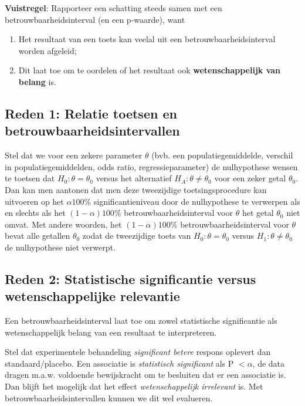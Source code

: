 \documentclass[
  12pt,dutch,coursenotes]{book}
\providecommand{\tightlist}{%
  \setlength{\itemsep}{0pt}\setlength{\parskip}{0pt}}
\theoremstyle{definition}
\theoremstyle{definition}
\theoremstyle{definition}
\theoremstyle{remark}
\begin{document}
\textbf{Vuistregel}:
Rapporteer een schatting steeds samen met een betrouwbaarheidsinterval (en een p-waarde), want

\begin{enumerate}
\def\labelenumi{\arabic{enumi}.}
\tightlist
\item
  Het resultaat van een toets kan veelal uit een betrouwbaarheidsinterval worden afgeleid;
\item
  Dit laat toe om te oordelen of het resultaat ook \textbf{wetenschappelijk van belang} is.
\end{enumerate}

\hypertarget{reden-1-relatie-toetsen-en-betrouwbaarheidsintervallen}{%
\subsection{Reden 1: Relatie toetsen en betrouwbaarheidsintervallen}\label{reden-1-relatie-toetsen-en-betrouwbaarheidsintervallen}}

Stel dat we voor een zekere parameter \(\theta\) (bvb. een
populatiegemiddelde, verschil in populatiegemiddelden, odds ratio,
regressieparameter) de nulhypothese wensen te toetsen dat \(H_0 : \theta= \theta_0\) versus het alternatief \(H_A : \theta \neq \theta_0\) voor een zeker
getal \(\theta_0\). Dan kan men aantonen dat men deze tweezijdige
toetsingsprocedure kan uitvoeren op het \(\alpha 100\%\) significantieniveau
door de nulhypothese te verwerpen als en slechts als het \((1-\alpha)100\%\)
betrouwbaarheidsinterval voor \(\theta\) het getal \(\theta_0\) niet omvat. Met
andere woorden, het \((1-\alpha)100\%\) betrouwbaarheidsinterval voor \(\theta\)
bevat alle getallen \(\theta_0\) zodat de tweezijdige toets van \(H_0 : \theta= \theta_0\) versus \(H_1 : \theta \neq \theta_0\) de nulhypothese niet verwerpt.

\hypertarget{reden-2-statistische-significantie-versus-wetenschappelijke-relevantie}{%
\subsection{Reden 2: Statistische significantie versus wetenschappelijke relevantie}\label{reden-2-statistische-significantie-versus-wetenschappelijke-relevantie}}

Een betrouwbaarheidsinterval laat toe om zowel statistische significantie als wetenschappelijk belang van een resultaat te interpreteren.

Stel dat experimentele behandeling \emph{significant betere} respons oplevert dan standaard/placebo.
Een associatie is \emph{statistisch significant} als P \(< \alpha\),
de data dragen m.a.w. voldoende bewijskracht om te besluiten dat er een associatie is. Dan blijft het mogelijk dat het effect \emph{wetenschappelijk irrelevant} is.
Met betrouwbaarheidsintervallen kunnen we dit wel evalueren.
\end{document}

